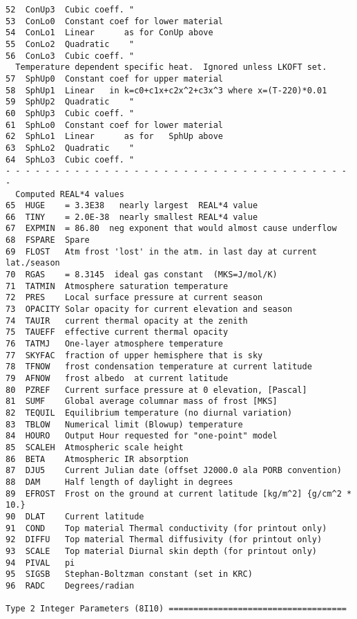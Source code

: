 \documentclass[draft]{article}  %
\begin{document}
\begin{verbatim}
52  ConUp3  Cubic coeff. "
53  ConLo0  Constant coef for lower material 
54  ConLo1  Linear      as for ConUp above
55  ConLo2  Quadratic    "
56  ConLo3  Cubic coeff. "
  Temperature dependent specific heat.  Ignored unless LKOFT set.
57  SphUp0  Constant coef for upper material 
58  SphUp1  Linear   in k=c0+c1x+c2x^2+c3x^3 where x=(T-220)*0.01
59  SphUp2  Quadratic    " 
60  SphUp3  Cubic coeff. "
61  SphLo0  Constant coef for lower material 
62  SphLo1  Linear      as for   SphUp above
63  SphLo2  Quadratic    "
64  SphLo3  Cubic coeff. "
- - - - - - - - - - - - - - - - - - - - - - - - - - - - - - - - - - - -
  Computed REAL*4 values 
65  HUGE    = 3.3E38   nearly largest  REAL*4 value
66  TINY    = 2.0E-38  nearly smallest REAL*4 value
67  EXPMIN  = 86.80  neg exponent that would almost cause underflow
68  FSPARE  Spare
69  FLOST   Atm frost 'lost' in the atm. in last day at current lat./season
70  RGAS    = 8.3145  ideal gas constant  (MKS=J/mol/K)
71  TATMIN  Atmosphere saturation temperature
72  PRES    Local surface pressure at current season
73  OPACITY Solar opacity for current elevation and season
74  TAUIR   current thermal opacity at the zenith
75  TAUEFF  effective current thermal opacity 
76  TATMJ   One-layer atmosphere temperature
77  SKYFAC  fraction of upper hemisphere that is sky
78  TFNOW   frost condensation temperature at current latitude
79  AFNOW   frost albedo  at current latitude
80  PZREF   Current surface pressure at 0 elevation, [Pascal]
81  SUMF    Global average columnar mass of frost [MKS]
82  TEQUIL  Equilibrium temperature (no diurnal variation)
83  TBLOW   Numerical limit (Blowup) temperature
84  HOURO   Output Hour requested for "one-point" model
85  SCALEH  Atmospheric scale height
86  BETA    Atmospheric IR absorption
87  DJU5    Current Julian date (offset J2000.0 ala PORB convention)
88  DAM     Half length of daylight in degrees
89  EFROST  Frost on the ground at current latitude [kg/m^2] {g/cm^2 * 10.} 
90  DLAT    Current latitude
91  COND    Top material Thermal conductivity (for printout only)
92  DIFFU   Top material Thermal diffusivity (for printout only)
93  SCALE   Top material Diurnal skin depth (for printout only)
94  PIVAL   pi
95  SIGSB   Stephan-Boltzman constant (set in KRC)
96  RADC    Degrees/radian

Type 2 Integer Parameters (8I10) ====================================


\end{verbatim}
\end{document}
